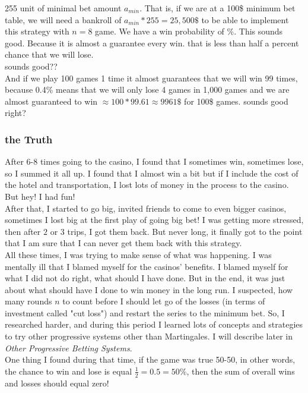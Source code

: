 \documentclass{article}
\begin{document}
255 unit of minimal bet amount $a_{min}$.  That is, if we are at a 100\$ minimum bet table, we will need a bankroll of $a_{min} * 255 = 25,500\$$ to be able to implement this strategy with $n=8$ game.  We have a win probability of \%.  This sounds good. Because it is almost a guarantee every win. that is less than half a percent chance that we will lose. \\

sounds good??\\

And if we play 100 games 1 time it almost guarantees that we will win 99 times, because 0.4\% means that we will only lose 4 games in 1,000 games and we are almost guaranteed to win $\approx100*99.61\approx9961\$$ for 100\$ games.  sounds good right?
\subsubsection{the Truth}

After 6-8 times going to the casino, I found that I sometimes win, sometimes lose, so I summed it all up.  I found that I almost win a bit but if I include the cost of the hotel and transportation, I lost lots of money in the process to the casino.  But hey! I had fun!\\

After that, I started to go big, invited friends to come to even bigger casinos, sometimes I lost big at the first play of going big bet!  I was getting more stressed, then after $2$ or $3$ trips, I got them back.  But never long, it finally got to the point that I am sure that I can never get them back with this strategy.\\

All these times, I was trying to make sense of what was happening. I was mentally ill that I blamed myself for the casinos' benefits. I blamed myself for what I did not do right, what should I have done.  But in the end, it was just about what should have I done to win money in the long run.  I suspected, how many rounds $n$ to count before I should let go of the losses (in terms of investment called "cut loss") and restart the series to the minimum bet.  So, I researched harder, and during this period I learned lots of concepts and strategies to try other progressive systems other than Martingales.  I will describe later in \emph{Other Progressive Betting Systems}.\\

One thing I found during that time, if the game was true 50-50, in other words, the chance to win and lose is equal $\frac{1}{2}=0.5=50\%$, then the sum of overall wins and losses should equal zero! \\
\end{document}

